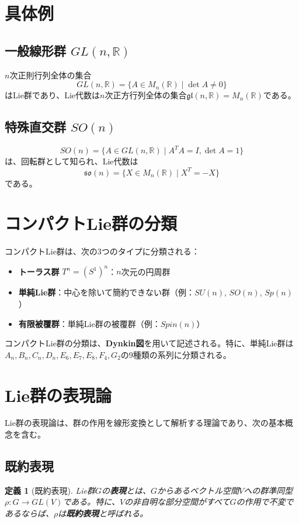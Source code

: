 \documentclass{article}
\newtheorem{definition}{定義} %
\begin{document}
\section{具体例}
\subsection{一般線形群 $GL(n, \mathbb{R})$}
$n$次正則行列全体の集合
\[
GL(n, \mathbb{R}) = \{ A \in M_n(\mathbb{R}) \mid \det A \neq 0 \}
\]
はLie群であり、Lie代数は$n$次正方行列全体の集合$\mathfrak{gl}(n, \mathbb{R}) = M_n(\mathbb{R})$である。

\subsection{特殊直交群 $SO(n)$}
\[
SO(n) = \{ A \in GL(n, \mathbb{R}) \mid A^T A = I, \det A = 1 \}
\]
は、回転群として知られ、Lie代数は
\[
\mathfrak{so}(n) = \{ X \in M_n(\mathbb{R}) \mid X^T = -X \}
\]
である。

\section{コンパクトLie群の分類}
コンパクトLie群は、次の3つのタイプに分類される：
\begin{itemize}
    \item \textbf{トーラス群} $T^n = (S^1)^n$：$n$次元の円周群
    \item \textbf{単純Lie群}：中心を除いて簡約できない群（例：$SU(n)$, $SO(n)$, $Sp(n)$）
    \item \textbf{有限被覆群}：単純Lie群の被覆群（例：$Spin(n)$）
\end{itemize}
コンパクトLie群の分類は、\textbf{Dynkin図}を用いて記述される。特に、単純Lie群は$A_n, B_n, C_n, D_n, E_6, E_7, E_8, F_4, G_2$の9種類の系列に分類される。

\section{Lie群の表現論}
Lie群の表現論は、群の作用を線形変換として解析する理論であり、次の基本概念を含む。

\subsection{既約表現}
\begin{definition}[既約表現]
Lie群$G$の\textbf{表現}とは、$G$からあるベクトル空間$V$への群準同型$\rho: G \to GL(V)$である。特に、$V$の非自明な部分空間がすべて$G$の作用で不変であるならば、$\rho$は\textbf{既約表現}と呼ばれる。
\end{definition}
\end{document}
